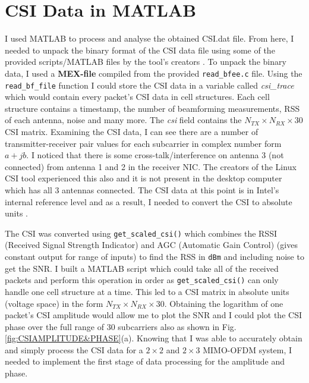 \section{CSI Data in MATLAB}
I used MATLAB to process and analyse the obtained CSI.dat file. From here, I needed to unpack the binary format of the CSI data file using some of the provided scripts/MATLAB files by the tool's creators \citep{Halperin_csitool}. To unpack the binary data, I used a \textbf{MEX-file} compiled from the provided \lstinline{read_bfee.c} file. Using the \lstinline{read_bf_file} function I could store the CSI data in a variable called \textit{csi\_trace} which would contain every packet's CSI data in cell structures. Each cell structure contains a timestamp, the number of beamforming measurements, RSS of each antenna, noise and many more. The \textit{csi} field contains the $N_{TX}\times N_{RX}\times 30$ CSI matrix. Examining the CSI data, I can see there are a number of transmitter-receiver pair values for each subcarrier in complex number form $a + jb$. I noticed that there is some cross-talk/interference on antenna 3 (not connected) from antenna 1 and 2 in the receiver NIC. The creators of the Linux CSI tool experienced this also and it is not present in the desktop computer which has all 3 antennas connected. The CSI data at this point is in Intel's internal reference level and as a result, I needed to convert the CSI to absolute units \citep{Halperin_csitool}. \par
The CSI was converted using \lstinline{get_scaled_csi()} which combines the RSSI (Received Signal Strength Indicator) and AGC (Automatic Gain Control) (gives constant output for range of inputs) to find the RSS in \lstinline{dBm} and including noise to get the SNR. I built a MATLAB script which could take all of the received packets and perform this operation in order as \lstinline{get_scaled_csi()} can only handle one cell structure at a time. This led to a CSI matrix in absolute units (voltage space) in the form $N_{TX}\times N_{RX}\times30$. Obtaining the logarithm of one packet's CSI amplitude would allow me to plot the SNR and I could plot the CSI phase over the full range of 30 subcarriers also as shown in Fig. \ref{fig:CSIAMPLITUDE&PHASE}(a).
Knowing that I was able to accurately obtain and simply process the CSI data for a $2\times 2$ and $2\times 3$ MIMO-OFDM system, I needed to implement the first stage of data processing for the amplitude and phase. 

